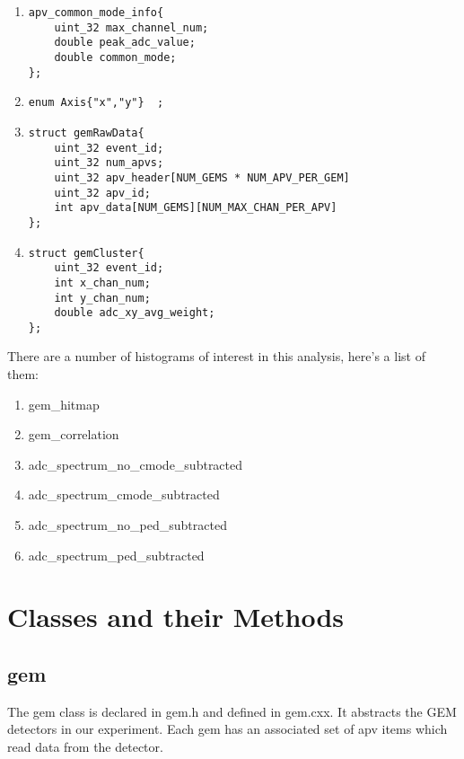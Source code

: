 \documentclass[11pt]{article}
\begin{document}
\begin{enumerate}
	\item 
	\begin{lstlisting}	
apv_common_mode_info{
	uint_32 max_channel_num;
	double peak_adc_value;
	double common_mode;
};
	\end{lstlisting}
	
	\item 
	\begin{lstlisting}	
enum Axis{"x","y"}	;
	\end{lstlisting}

	\item
	\begin{lstlisting}
struct gemRawData{
	uint_32 event_id;
	uint_32 num_apvs;
	uint_32 apv_header[NUM_GEMS * NUM_APV_PER_GEM]
	uint_32 apv_id;
	int apv_data[NUM_GEMS][NUM_MAX_CHAN_PER_APV]		
};
	\end{lstlisting}
	
	\item 
	\begin{lstlisting}	
struct gemCluster{
	uint_32 event_id;
	int x_chan_num;
	int y_chan_num;	
	double adc_xy_avg_weight;
};
	\end{lstlisting}
	
\end{enumerate}

There are a number of histograms of interest in this analysis, here's a list of them:

\begin{enumerate}
	\item gem\_hitmap
	\item gem\_correlation
	\item adc\_spectrum\_no\_cmode\_subtracted
	\item adc\_spectrum\_cmode\_subtracted
	\item adc\_spectrum\_no\_ped\_subtracted
	\item adc\_spectrum\_ped\_subtracted
	
\end{enumerate}

\section{Classes and their Methods}
	\subsection{gem}
	The gem class is declared in gem.h and defined in gem.cxx. It abstracts the GEM detectors in our experiment. Each gem has an associated set of apv items which read data from the detector. \\
 
\end{document}
